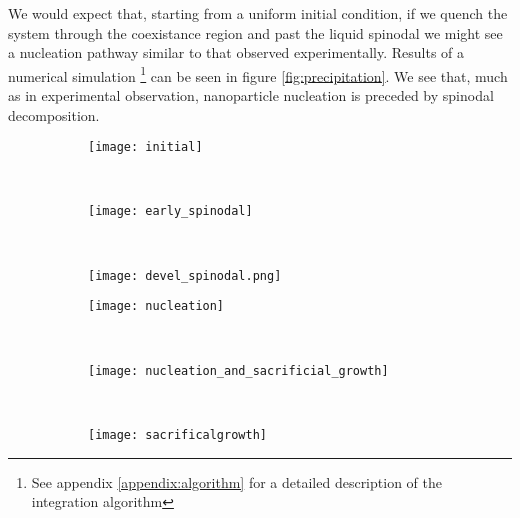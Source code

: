 We would expect that, starting from a uniform initial condition, if we quench
the system through the coexistance region and past the liquid spinodal we might
see a nucleation pathway similar to that observed experimentally. Results of a
numerical simulation \footnote{See appendix \ref{appendix:algorithm} for a
detailed description of the integration algorithm} can be seen in figure
\ref{fig:precipitation}. We see that, much as in experimental observation,
nanoparticle nucleation is preceded by spinodal decomposition.

\begin{figure}
    \centering
    \begin{subfigure}[b]{0.3\textwidth}
        \texttt{[image: initial]}
        \label{fig:initial}
        \caption{}
    \end{subfigure}
    ~
    \begin{subfigure}[b]{0.3\textwidth}
        \texttt{[image: early\_spinodal]}
        \label{fig:early_spinodal}
        \caption{}
    \end{subfigure}
    ~
    \begin{subfigure}[b]{0.3\textwidth}
        \texttt{[image: devel\_spinodal.png]}
        \label{fig:devel_spinodal}
        \caption{}
    \end{subfigure}

    \vspace{0.25cm}
    \begin{subfigure}[b]{0.3\textwidth}
        \texttt{[image: nucleation]}
        \label{fig:nucleation}
        \caption{}
    \end{subfigure}
    ~
    \begin{subfigure}[b]{0.3\textwidth}
        \texttt{[image: nucleation\_and\_sacrificial\_growth]}
        \label{fig:nucleation_and_growth}
        \caption{} 
    \end{subfigure}
    ~
    \begin{subfigure}[b]{0.3\textwidth}
        \texttt{[image: sacrificalgrowth]}
        \label{fig:sacrifical_growth}
        \caption{}
    \end{subfigure}
    

\end{figure}

